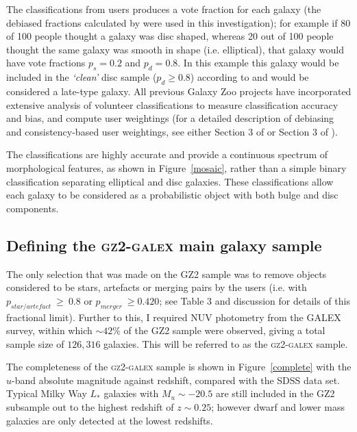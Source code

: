 The classifications from users produces a vote fraction for each galaxy (the debiased fractions calculated by \citet{GZ2} were used in this investigation); for example if 80 of 100 people thought a galaxy was disc shaped, whereas 20 out of 100 people thought the same galaxy was smooth in shape (i.e. elliptical), that galaxy would have vote fractions $p_{s} = 0.2$ and $p_{d} = 0.8$. In this example this galaxy would be included in the \emph{`clean'} disc sample ($p_d \geq 0.8$) according to \cite{GZ2} and would be considered a late-type galaxy. All previous Galaxy Zoo projects have incorporated extensive analysis of volunteer classifications to measure classification accuracy and bias, and compute user weightings (for a detailed description of debiasing and consistency-based user weightings, see either Section 3 of \citealt{Lintott09} or Section 3 of \citealt{GZ2}). 


The classifications are highly accurate and provide a continuous spectrum of morphological features, as shown in Figure~\ref{mosaic}, rather than a simple binary classification separating elliptical and disc galaxies. These classifications allow each galaxy to be considered as a probabilistic object with both bulge and disc components. 

\subsection{Defining the \textsc{gz2-galex} main galaxy sample}

The only selection that was made on the GZ2 sample was to remove objects considered to be stars, artefacts or merging pairs by the users (i.e. with $p_{star/artefact} ~\geq~ 0.8$ or $p_{merger} ~\geq 0.420$; see \citealt{GZ2} Table 3 and discussion for details of this fractional limit). Further to this, I required NUV photometry from the GALEX survey, within which $\sim42\%$ of the GZ2 sample were observed, giving a total sample size of $126, 316$ galaxies. This will be referred to as the \textsc{gz2-galex} sample. 

The completeness of the \textsc{gz2-galex} sample is shown in Figure~\ref{complete} with the $u$-band absolute magnitude against redshift, compared with the SDSS data set. Typical Milky Way $L_*$ galaxies with $M_u \sim -20.5$ are still included in the GZ2 subsample out to the highest redshift of $z \sim 0.25$; however dwarf and lower mass galaxies are only detected at the lowest redshifts.
